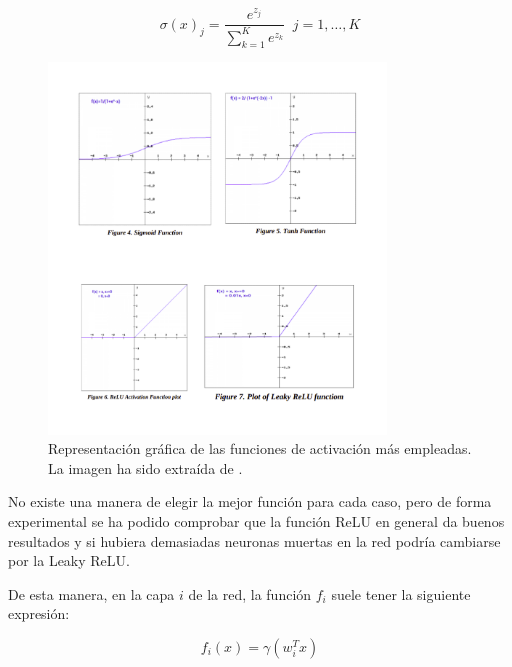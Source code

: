 \begin{itemize}
                \begin{equation}
                    \sigma(x)_j= \frac{e^{z_j}}{\sum_{k=1}^{K}e^{z_k}} \; \; j=1, \ldots, K
                \end{equation}
            \end{itemize}

            \begin{figure}[!h]
                \centering
                \includegraphics[width=0.8\textwidth]{img/functions.png}
                \caption{Representación gráfica de las funciones de activación más empleadas. La imagen ha sido extraída de  \cite{sharma2017activation}.}
                \label{fig:GrafoComputacional}
            \end{figure}

            \noindent No existe una manera de elegir la mejor función para cada caso, pero de forma experimental se ha podido comprobar que la función ReLU en general da buenos resultados y si hubiera demasiadas neuronas muertas en la red podría cambiarse por la Leaky ReLU.

            \medskip

            \noindent De esta manera, en la capa $i$ de la red, la función $f_i$ suele tener la siguiente expresión: 

            \begin{equation}
                f_i(x)=\gamma(w_i^T x)
            \end{equation}

